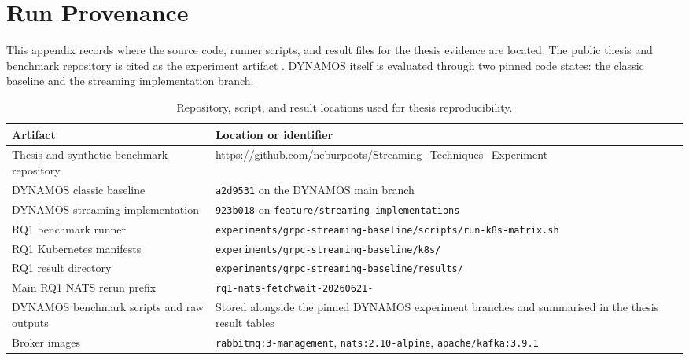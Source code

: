 \clearpage
\section{Run Provenance}
\label{app:run-provenance}

This appendix records where the source code, runner scripts, and result files for the thesis evidence are located. The public thesis and benchmark repository is cited as the experiment artifact \cite{streamingTechniquesExperiment2026}. DYNAMOS itself is evaluated through two pinned code states: the classic baseline and the streaming implementation branch.

\begin{table}[!htbp]
    \centering
    \scriptsize
    \caption{Repository, script, and result locations used for thesis reproducibility.}
    \label{tab:appendix-provenance}
    \setlength{\tabcolsep}{3pt}
    \begin{tabularx}{\textwidth}{p{}X}
        \toprule
        Artifact & Location or identifier \\
        \midrule
        Thesis and synthetic benchmark repository & \url{https://github.com/neburpoots/Streaming_Techniques_Experiment} \\
        DYNAMOS classic baseline & \texttt{a2d9531} on the DYNAMOS main branch \cite{dynamosMainCommit2026} \\
        DYNAMOS streaming implementation & \texttt{923b018} on \texttt{feature/streaming-implementations} \cite{dynamosStreamingCommit2026} \\
        RQ1 benchmark runner & \texttt{experiments/grpc-streaming-baseline/scripts/run-k8s-matrix.sh} \\
        RQ1 Kubernetes manifests & \texttt{experiments/grpc-streaming-baseline/k8s/} \\
        RQ1 result directory & \texttt{experiments/grpc-streaming-baseline/results/} \\
        Main RQ1 NATS rerun prefix & \texttt{rq1-nats-fetchwait-20260621-} \\
        DYNAMOS benchmark scripts and raw outputs & Stored alongside the pinned DYNAMOS experiment branches and summarised in the thesis result tables \\
        Broker images & \texttt{rabbitmq:3-management}, \texttt{nats:2.10-alpine}, \texttt{apache/kafka:3.9.1} \\
        \bottomrule
    \end{tabularx}
\end{table}

